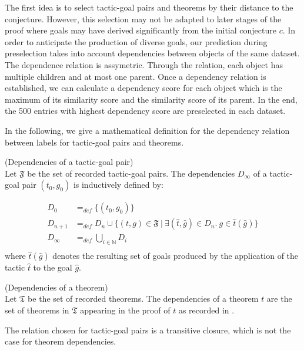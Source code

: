 \documentclass[runningheads,a4paper,draft]{svjour3}
\begin{document}
The first idea is to select tactic-goal pairs and theorems by their distance to
the conjecture. However, this selection may not be adapted to later stages of
the proof where goals may have derived significantly from the
initial conjecture $c$. In order to
anticipate the production of diverse goals, our prediction during preselection
takes into account dependencies between objects of the same dataset.
The dependence relation is assymetric. Through the relation, each object has
multiple children and at most one parent.
Once a dependency relation is established, we can calculate a dependency score
for each object which is the maximum of its similarity score and the similarity
score of its parent. In the end, the 500 entries with highest dependency score
are preselected in each dataset.

In the following, we give a mathematical definition for the dependency relation
between labels for tactic-goal pairs and theorems.

\begin{definition}(Dependencies of a tactic-goal pair)\\
Let $\mathfrak{F}$ be the set of recorded tactic-goal pairs.
The dependencies $D_\infty$ of a tactic-goal pair $(t_0,g_0)$ is
inductively defined by:

\begin{align*}
D_0 &=_{def} \lbrace (t_0,g_0) \rbrace \\
D_{n+1} &=_{def} D_n \cup \lbrace (t,g)\in \mathfrak{F}\  |\ \exists
(\hat{t},\hat{g}) \in D_n.\ g \in \hat{t}(\hat{g}) \rbrace  \\
D_\infty &=_{def} \bigcup_{i \in \mathbb{N}} D_i\\
\end{align*}
where $\hat{t}(\hat{g})$ denotes the resulting set of goals produced by the
application
of the tactic $\hat{t}$ to the goal $\hat{g}$.
\end{definition}


\begin{definition}(Dependencies of a theorem)\\
Let $\mathfrak{T}$ be the set of recorded theorems.
The dependencies of a theorem $t$ are the set of theorems in
$\mathfrak{T}$ appearing in the proof of $t$ as recorded in
\cite{tgck-cpp15}.
\end{definition}

\begin{remark}
The relation chosen for tactic-goal pairs is a transitive
closure, which is not the case for theorem dependencies.
\end{remark}
\end{document}
